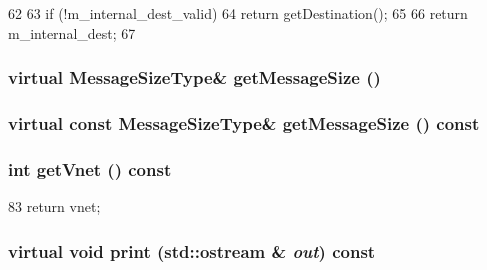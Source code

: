 \begin{DoxyCode}
62     {
63         if (!m_internal_dest_valid)
64             return getDestination();
65 
66         return m_internal_dest;
67     }
\end{DoxyCode}
\hypertarget{classNetworkMessage_a0cd5251e519c349113864792294b647a}{
\subsubsection[{getMessageSize}]{\setlength{\rightskip}{0pt plus 5cm}virtual MessageSizeType\& getMessageSize ()}}
\label{classNetworkMessage_a0cd5251e519c349113864792294b647a}
\hypertarget{classNetworkMessage_a105ae7cce3df14eef54796f817f531ca}{
\subsubsection[{getMessageSize}]{\setlength{\rightskip}{0pt plus 5cm}virtual const MessageSizeType\& getMessageSize () const}}
\label{classNetworkMessage_a105ae7cce3df14eef54796f817f531ca}
\hypertarget{classNetworkMessage_ab673c798567dd25e7a478ec0574fab4c}{
\subsubsection[{getVnet}]{\setlength{\rightskip}{0pt plus 5cm}int getVnet () const}}
\label{classNetworkMessage_ab673c798567dd25e7a478ec0574fab4c}



\begin{DoxyCode}
83 { return vnet; }
\end{DoxyCode}
\hypertarget{classNetworkMessage_a3ea5f7af5db62cc24f4e40df9ea5c971}{
\subsubsection[{print}]{\setlength{\rightskip}{0pt plus 5cm}virtual void print (std::ostream \& {\em out}) const}}
\label{classNetworkMessage_a3ea5f7af5db62cc24f4e40df9ea5c971}


